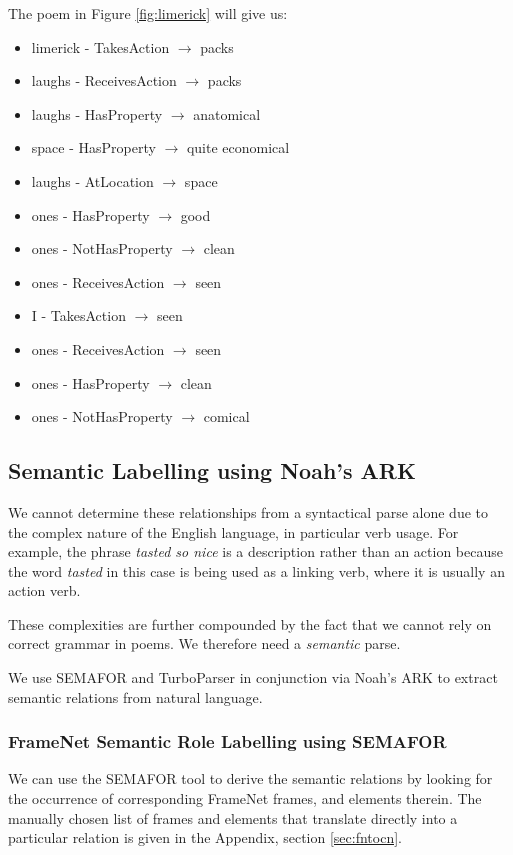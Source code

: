 The poem in Figure \ref{fig:limerick} will give us:
\begin{itemize}
\item{limerick - TakesAction $\rightarrow$ packs}
\item{laughs - ReceivesAction $\rightarrow$ packs}
\item{laughs - HasProperty $\rightarrow$ anatomical}
\item{space - HasProperty $\rightarrow$ quite economical}
\item{laughs - AtLocation $\rightarrow$ space}
\item{ones - HasProperty $\rightarrow$ good}
\item{ones - NotHasProperty $\rightarrow$ clean}
\item{ones - ReceivesAction $\rightarrow$ seen}
\item{I - TakesAction $\rightarrow$ seen}
\item{ones - ReceivesAction $\rightarrow$ seen}
\item{ones - HasProperty $\rightarrow$ clean}
\item{ones - NotHasProperty $\rightarrow$ comical}
\end{itemize}


\subsection{Semantic Labelling using Noah's ARK}

We cannot determine these relationships from a syntactical parse alone due to the complex nature of the English language, in particular verb usage. For example, the phrase \textit{tasted so nice} is a description rather than an action because the word \textit{tasted} in this case is being used as a linking verb, where it is usually an action verb.

These complexities are further compounded by the fact that we cannot rely on correct grammar in poems. We therefore need a \textit{semantic} parse. 

We use SEMAFOR and TurboParser in conjunction via Noah's ARK to extract semantic relations from natural language.

\subsubsection{FrameNet Semantic Role Labelling using SEMAFOR}
\label{sec:sema}

We can use the SEMAFOR tool to derive the semantic relations by looking for the occurrence of corresponding FrameNet frames, and elements therein. The manually chosen list of frames and elements that translate directly into a particular relation is given in the Appendix, section \ref{sec:fntocn}.

